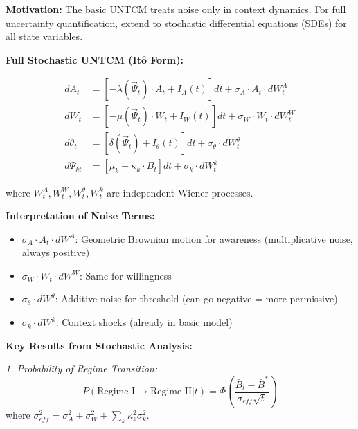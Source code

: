 \begin{tcolorbox}[colback=purple!5!white, colframe=purple!75!black,
    title=\textbf{Method UNTCM-M3: Stochastic Extension (Full SDE)}]

\textbf{Motivation:} The basic UNTCM treats noise only in context dynamics. For full uncertainty quantification, extend to stochastic differential equations (SDEs) for all state variables.

\textbf{Full Stochastic UNTCM (Itô Form):}

\begin{equation}
\boxed{
\begin{aligned}
dA_t &= \left[ -\lambda(\vec{\Psi}_t) \cdot A_t + I_A(t) \right] dt + \sigma_A \cdot A_t \cdot dW_t^A \\
dW_t &= \left[ -\mu(\vec{\Psi}_t) \cdot W_t + I_W(t) \right] dt + \sigma_W \cdot W_t \cdot dW_t^W \\
d\theta_t &= \left[ \delta(\vec{\Psi}_t) + I_\theta(t) \right] dt + \sigma_\theta \cdot dW_t^\theta \\
d\Psi_{kt} &= \left[ \mu_k + \kappa_k \cdot \bar{B}_t \right] dt + \sigma_k \cdot dW_t^k
\end{aligned}
}
\label{eq:untcm-sde}
\end{equation}

where $W_t^A, W_t^W, W_t^\theta, W_t^k$ are independent Wiener processes.

\textbf{Interpretation of Noise Terms:}
\begin{itemize}[nosep]
\item $\sigma_A \cdot A_t \cdot dW^A$: Geometric Brownian motion for awareness (multiplicative noise, always positive)
\item $\sigma_W \cdot W_t \cdot dW^W$: Same for willingness
\item $\sigma_\theta \cdot dW^\theta$: Additive noise for threshold (can go negative = more permissive)
\item $\sigma_k \cdot dW^k$: Context shocks (already in basic model)
\end{itemize}

\textbf{Key Results from Stochastic Analysis:}

\textit{1. Probability of Regime Transition:}
\begin{equation}
P(\text{Regime I} \to \text{Regime II} | t) = \Phi\left( \frac{\bar{B}_t - \bar{B}^*}{\sigma_{eff} \sqrt{t}} \right)
\end{equation}
where $\sigma_{eff}^2 = \sigma_A^2 + \sigma_W^2 + \sum_k \kappa_k^2 \sigma_k^2$.


\end{tcolorbox}
